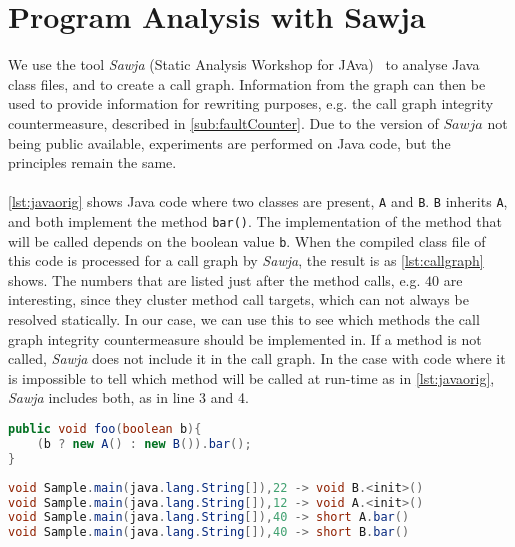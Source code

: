 \section{Program Analysis with Sawja}\label{sec:sawja}
We use the tool \textit{Sawja} (Static Analysis Workshop for JAva)~\cite{sawja} to analyse Java class files, and to create a call graph. Information from the graph can then be used to provide information for rewriting purposes, e.g. the call graph integrity countermeasure, described in \cref{sub:faultCounter}. Due to the \jc version of $Sawja$ not being public available, experiments are performed on Java code, but the principles remain the same.\\\\
\cref{lst:javaorig} shows Java code where two classes are present, \texttt{A} and \texttt{B}. \texttt{B} inherits \texttt{A}, and both implement the method \texttt{bar()}. The implementation of the method that will be called depends on the boolean value \texttt{b}. When the compiled class file of this code is processed for a call graph by \textit{Sawja}, the result is as \cref{lst:callgraph} shows. The numbers that are listed just after the method calls, e.g. $40$ are interesting, since they cluster method call targets, which can not always be resolved statically. In our case, we can use this to see which methods the call graph integrity countermeasure should be implemented in. If a method is not called, \textit{Sawja} does not include it in the call graph.
In the case with code where it is impossible to tell which method will be called at run-time as in \cref{lst:javaorig}, \textit{Sawja} includes both, as in line 3 and 4.


\begin{lstlisting}[caption=Java sample.,language=Java,label=lst:javaorig]
public void foo(boolean b){
    (b ? new A() : new B()).bar();
}
\end{lstlisting}



\begin{lstlisting}[caption=Call graph generated by \textit{Sawja}.,language=Java,label=lst:callgraph]
void Sample.main(java.lang.String[]),22 -> void B.<init>()
void Sample.main(java.lang.String[]),12 -> void A.<init>()
void Sample.main(java.lang.String[]),40 -> short A.bar()
void Sample.main(java.lang.String[]),40 -> short B.bar()
\end{lstlisting}


